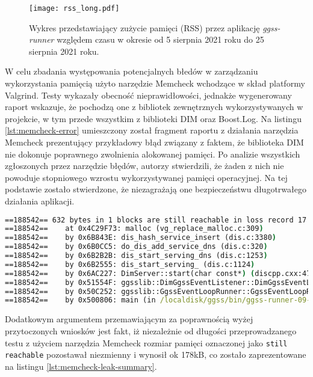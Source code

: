 \begin{figure}[H]
    \centering
    \texttt{[image: rss\_long.pdf]}
    \caption{Wykres przedstawiający zużycie pamięci (RSS) przez aplikację \emph{ggss-runner} względem czasu w okresie od 5 sierpnia 2021 roku do 25 sierpnia 2021 roku.}
    \label{fig:rss-long}
\end{figure}

W celu zbadania występowania potencjalnych błedów w zarządzaniu wykorzystania pamięcią użyto narzędzie Memcheck wchodzące w skład platformy Valgrind. Testy wykazały obecność nieprawidłowości, jednakże wygenerowany raport wskazuje, że pochodzą one z bibliotek zewnętrznych wykorzystywanych w projekcie, w tym przede wszystkim z biblioteki DIM oraz Boost.Log. Na listingu \ref{lst:memcheck-error} umieszczony został fragment raportu z działania narzędzia Memcheck prezentujący przykładowy błąd związany z faktem, że biblioteka DIM nie dokonuje poprawnego zwolnienia alokowanej pamięci. Po analizie wszystkich zgłoszonych przez narzędzie błędów, autorzy stwierdzili, że żaden z nich nie powoduje stopniowego wzrostu wykorzystywanej pamięci operacyjnej. Na tej podstawie zostało stwierdzone, że niezagrażają one bezpieczeństwu długotrwałego działania aplikacji.

\begin{lstlisting}[language=cmd,caption={Przkładowy błąd raportowany przez narzędzie Memcheck},frame=single, label={lst:memcheck-error}]
==188542== 632 bytes in 1 blocks are still reachable in loss record 17 of 37
==188542==    at 0x4C29F73: malloc (vg_replace_malloc.c:309)
==188542==    by 0x6B843E: dis_hash_service_insert (dis.c:3380)
==188542==    by 0x6B0CC5: do_dis_add_service_dns (dis.c:320)
==188542==    by 0x6B2B2B: dis_start_serving_dns (dis.c:1253)
==188542==    by 0x6B2555: dis_start_serving_ (dis.c:1124)
==188542==    by 0x6AC227: DimServer::start(char const*) (discpp.cxx:476)
==188542==    by 0x51554F: ggsslib::DimGgssEventListener::DimGgssEventListener(std::string const&, std::string const&) (in /localdisk/ggss/bin/ggss-runner-09-08-2021)
==188542==    by 0x50C252: ggsslib::GgssEventLoopRunner::GgssEventLoopRunner(boost::asio::io_service&, std::string const&) (in /localdisk/ggss/bin/ggss-runner-09-08-2021)
==188542==    by 0x500806: main (in /localdisk/ggss/bin/ggss-runner-09-08-2021)
\end{lstlisting}

Dodatkowym argumentem przemawiającym za poprawnością wyżej przytoczonych wniosków jest fakt, iż niezależnie od długości przeprowadzanego testu z użyciem narzędzia Memcheck rozmiar pamięci oznaczonej jako \lstinline{still reachable} pozostawał niezmienny i wynosił ok 178kB, co zostało zaprezentowane na listingu \ref{lst:memcheck-leak-summary}.

